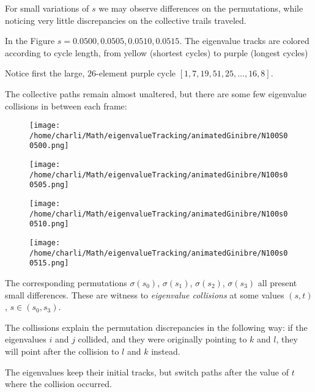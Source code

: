 \documentclass{article}
\begin{document}
	For small variations of $s$ we may observe differences on the permutations, 
	while noticing very little discrepancies on the collective trails traveled.

	In the Figure $s=0.0500, 0.0505, 0.0510, 0.0515$. 
	The eigenvalue tracks are colored according to cycle length, 
	from yellow (shortest cycles) to purple (longest cycles)
	
	Notice first the large, $26$-element purple cycle $[1, 7, 19, 51, 25, \dots, 16, 8]$. 

	The collective paths remain almost unaltered, 
	but there are some few eigenvalue collisions in between each frame:
	
	\begin{figure}[ht]
		\centering
		\begin{minipage}{0.48\textwidth}
			\centering
			\texttt{[image: /home/charli/Math/eigenvalueTracking/animatedGinibre/N100S00500.png]}
		\end{minipage}
		\hfill
		\begin{minipage}{0.48\textwidth}
			\centering
			\texttt{[image: /home/charli/Math/eigenvalueTracking/animatedGinibre/N100s00505.png]}
		\end{minipage}
		\vspace{0.5em}
		\begin{minipage}{0.48\textwidth}
			\centering
			\texttt{[image: /home/charli/Math/eigenvalueTracking/animatedGinibre/N100s00510.png]}
		\end{minipage}
		\hfill
		\begin{minipage}{0.48\textwidth}
			\centering
			\texttt{[image: /home/charli/Math/eigenvalueTracking/animatedGinibre/N100s00515.png]}
		\end{minipage}
	\end{figure}
	
	The corresponding permutations $\sigma(s_0)$, $\sigma(s_1)$, $\sigma(s_2)$, $\sigma(s_3)$ 
	all present small differences. 
	These are witness to \emph{eigenvalue collisions} 
	at some values $(s,t)$, $s \in (s_0, s_3)$.

	The collissions explain the permutation discrepancies in the following way: 
	if the eigenvalues $i$ and $j$ collided, 
	and they were originally pointing to $k$ and $l$, they will point after the collision 
	to $l$ and $k$ instead.
	
	The eigenvalues keep their initial tracks, 
	but switch paths after the value of $t$ where the collision occurred. 
\end{document}
